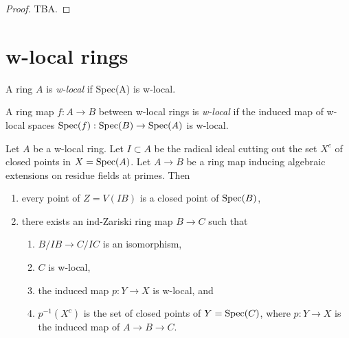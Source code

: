 \begin{proof}
  TBA.
\end{proof}

\section{w-local rings}

\begin{definition}
    A ring \(A\) is \emph{w-local} if Spec(A) is w-local.
    \label{def:w-local-ring}
    \leanok
\end{definition}

\begin{definition}
    A ring map \(f: A \to B\) between w-local rings is \emph{w-local} if the induced map of w-local spaces \(\operatorname{Spec}(f) : \operatorname{Spec}(B) \to \operatorname{Spec}(A)\) is w-local.

    \label{def:w-local-ring-map}
\end{definition}


\begin{lemma}
\label{thm:closed-points-isom-w-local}

Let $A$ be a w-local ring. Let $I \subset A$ be the radical ideal cutting out the set $X^c$ of closed points in $X = \operatorname{Spec} (A)$. Let $A \to B$ be a ring map inducing algebraic extensions on residue fields at primes. Then
\begin{enumerate}
    \item every point of $Z = V(IB)$ is a closed point of $\operatorname{Spec} (B)$,
    \item there exists an ind-Zariski ring map $B \to C$ such that
    \begin{enumerate}
        \item $B/IB \to C/IC$ is an isomorphism,
        \item $C$ is w-local,
        \item the induced map $p: Y \to X$ is w-local, and
        \item $p^{-1}(X^c)$ is the set of closed points of $Y = \operatorname{Spec} (C)$, where $p : Y \to X$ is the induced map of $A \to B \to C$.
    \end{enumerate}
\end{enumerate}
\end{lemma}

